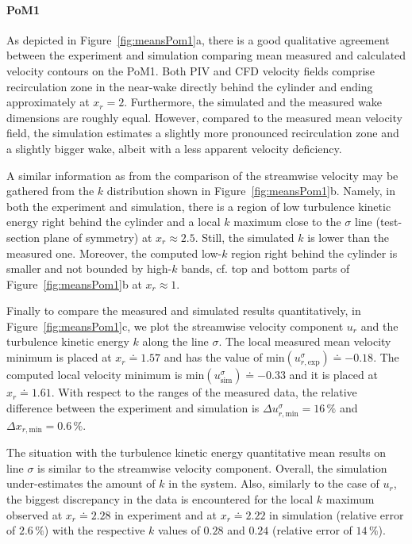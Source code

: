 \paragraph{PoM1}
As depicted in Figure~\ref{fig:meansPom1}a, there is a good qualitative agreement between the experiment and simulation comparing mean measured and calculated velocity contours on the PoM1. Both PIV and CFD velocity fields comprise recirculation zone in the near-wake directly behind the cylinder and ending approximately at $x_{{r}} = 2$. Furthermore, the simulated and the measured wake dimensions are roughly equal. However, compared to the measured mean velocity field, the simulation estimates a slightly more pronounced recirculation zone and a slightly bigger wake, albeit with a less apparent velocity deficiency.

A similar information as from the comparison of {the} streamwise velocity may be gathered from the {$k$} distribution {shown} in Figure~\ref{fig:meansPom1}b. Namely, in both the experiment and simulation, there is a region of low turbulence kinetic energy right behind the cylinder and a local {$k$} maximum close to the {$\sigma$ line (test-section plane of symmetry)} at $x_r \approx 2.5$. Still, the simulated $k$ is lower than the measured one. Moreover, the computed low-$k$ region right behind the cylinder is smaller and not bounded by high-$k$ bands, cf. {top and bottom parts of} Figure~\ref{fig:meansPom1}b at $x_r\approx 1$. 

Finally to compare {the} measured and simulated results quantitatively, {in Figure~\ref{fig:meansPom1}c,} we plot the streamwise velocity component $u_r$ and the turbulence kinetic energy $k$ along the line $\sigma$. The local measured mean velocity minimum is placed at $x_r\doteq 1.57$ and has the value of $\mathrm{min}(u_{r,\mathrm{exp}}^{\sigma})\doteq -0.18$. The computed local velocity minimum is $\mathrm{min}(u_{\mathrm{sim}}^{\sigma})\doteq -0.33$ and it is placed at $x_r\doteq 1.61$. With respect to the ranges of the measured data, the relative difference between the experiment and simulation is $\Delta u_{r,\mathrm{min}}^{\sigma} = 16\,\%$ and $\Delta x_{r,\mathrm{min}} = 0.6\,\%$. %

The situation with the turbulence kinetic energy {quantitative} mean results on line $\sigma$ is similar to the streamwise velocity component. Overall, the simulation under-estimates the amount of $k$ in the system. %
Also, similarly to the case of $u_{{r}}$, the biggest discrepancy in the data is encountered for the local $k$ maximum observed at $x_r\doteq 2.28$ in experiment and at $x_r\doteq 2.22$ in simulation (relative error of $2.6\,\%$) with the respective $k$ values of $0.28$ and $0.24$ (relative error of $14\,\%$).

